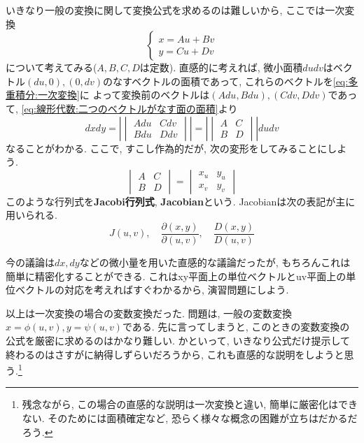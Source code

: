         いきなり一般の変換に関して変換公式を求めるのは難しいから, ここでは一次変換
        \begin{equation}
            \left\{\begin{array}{c}
                x=Au+Bv\\
                y=Cu+Dv
            \end{array}\right. \label{eq:多重積分:一次変換}
        \end{equation}
        について考えてみる($A,B,C,D$は定数). 直感的に考えれば, 微小面積$dudv$はベクトル$(du,0),(0,dv)$のなすベクトルの面積であって, これらのベクトルを\eqref{eq:多重積分:一次変換}に
        よって変換前のベクトルは$(Adu,Bdu),(Cdv,Ddv)$であって, \eqref{eq:線形代数:二つのベクトルがなす面の面積}より
        \begin{equation*}
            dxdy=\left|\begin{vmatrix}Adu & Cdv \\ Bdu & Ddv\end{vmatrix}\right|=\left|\begin{vmatrix}A & C \\ B & D\end{vmatrix}\right|dudv
        \end{equation*}
        なることがわかる. ここで, すこし作為的だが, 次の変形をしてみることにしよう.
        \begin{equation*}
            \begin{vmatrix}A & C \\ B & D\end{vmatrix}=\begin{vmatrix}x_u & y_u \\ x_v & y_v\end{vmatrix}
        \end{equation*}
        このような行列式を\textbf{Jacobi行列式}, \textbf{Jacobian}という. Jacobianは次の表記が主に用いられる.
        \begin{equation}
            J(u,v),\quad \frac{\partial(x,y)}{\partial(u,v)},\quad \frac{D(x,y)}{D(u,v)}
        \end{equation}

        今の議論は$dx,dy$などの微小量を用いた直感的な議論だったが, もちろんこれは簡単に精密化することができる. これはxy平面上の単位ベクトルとuv平面上の単位ベクトルの対応を考えればすぐわかるから, 
        演習問題にしよう.
        
        以上は一次変換の場合の変数変換だった. 問題は, 一般の変数変換$x=\phi(u,v),y=\psi(u,v)$である. 先に言ってしまうと, このときの変数変換の公式を厳密に求めるのはかなり難しい.
        かといって, いきなり公式だけ提示して終わるのはさすがに納得しずらいだろうから, これも直感的な説明をしようと思う.\footnote{残念ながら, この場合の直感的な説明は一次変換と違い, 簡単に厳密化はできない. そのためには面積確定など, 恐らく様々な概念の困難が立ちはだかるだろう.}
        
